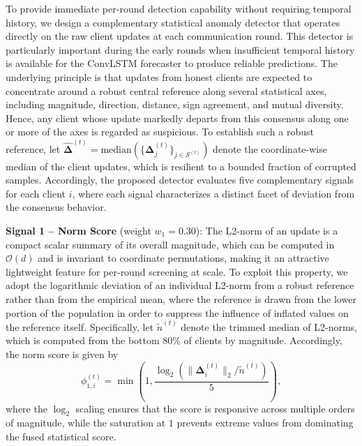 To provide immediate per-round detection capability without requiring temporal history, we design a complementary statistical anomaly detector that operates directly on the raw client updates at each communication round. This detector is particularly important during the early rounds when insufficient temporal history is available for the ConvLSTM forecaster to produce reliable predictions. The underlying principle is that updates from honest clients are expected to concentrate around a robust central reference along several statistical axes, including magnitude, direction, distance, sign agreement, and mutual diversity. Hence, any client whose update markedly departs from this consensus along one or more of the axes is regarded as suspicious. To establish such a robust reference, let $\hat{\boldsymbol{\Delta}}^{(t)} = \text{median}(\{\boldsymbol{\Delta}_j^{(t)}\}_{j \in \mathcal{S}^{(t)}})$ denote the coordinate-wise median of the client updates, which is resilient to a bounded fraction of corrupted samples. Accordingly, the proposed detector evaluates five complementary signals for each client $i$, where each signal characterizes a distinct facet of deviation from the consensus behavior.

\textbf{Signal 1 -- Norm Score} (weight $w_1 = 0.30$): The L2-norm of an update is a compact scalar summary of its overall magnitude, which can be computed in $\mathcal{O}(d)$ and is invariant to coordinate permutations, making it an attractive lightweight feature for per-round screening at scale. To exploit this property, we adopt the logarithmic deviation of an individual L2-norm from a robust reference rather than from the empirical mean, where the reference is drawn from the lower portion of the population in order to suppress the influence of inflated values on the reference itself. Specifically, let $\tilde{n}^{(t)}$ denote the trimmed median of L2-norms, which is computed from the bottom 80\% of clients by magnitude. Accordingly, the norm score is given by
\begin{equation}\label{eq:norm_score}
    \phi_{1,i}^{(t)} = \min\left(1, \frac{\log_2\left(\|\boldsymbol{\Delta}_i^{(t)}\|_2 / \tilde{n}^{(t)}\right)}{5}\right),
\end{equation}
where the $\log_2$ scaling ensures that the score is responsive across multiple orders of magnitude, while the saturation at $1$ prevents extreme values from dominating the fused statistical score.

